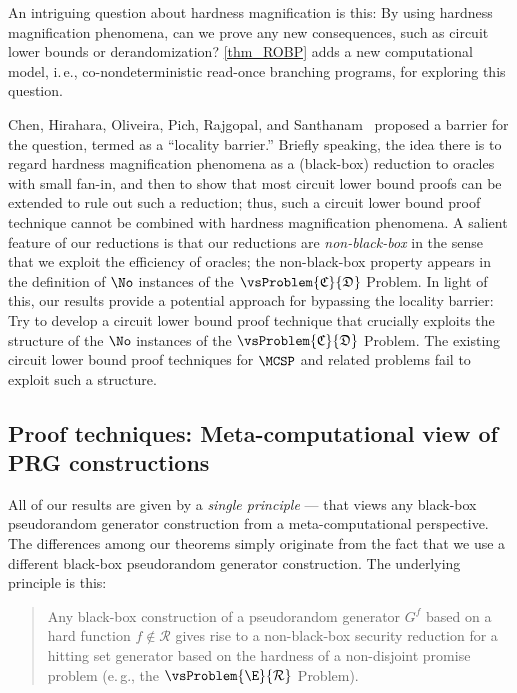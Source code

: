 \documentclass[11pt]{article}
\numberwithin{equation}{section}
\theoremstyle{definition}
\theoremstyle{plain}
\newcommand{\ie}{i.\,e.}
\newcommand{\eg}{e.\,g.}
\begin{document}
An intriguing question about hardness magnification is this:
By using hardness magnification phenomena,
can we prove any new consequences, such as
circuit lower bounds or derandomization?
%
\cref{thm_ROBP} adds a new computational model, \ie, co-nondeterministic read-once branching programs,
for exploring this question.

Chen, Hirahara, Oliveira, Pich, Rajgopal, and Santhanam~\cite{ChenHOPRS20_innovations_conf}
proposed a barrier for the question, termed as a ``locality barrier.''
Briefly speaking, the idea there is to regard hardness magnification phenomena
as a (black-box) reduction to oracles with small fan-in,
and then to show that most circuit lower bound proofs can be extended to rule
out such a reduction;
thus, such a circuit lower bound proof technique cannot be combined
with hardness magnification phenomena.
A salient feature of our reductions is that our reductions are \emph{non-black-box}
in the sense that we exploit the efficiency of oracles;
the non-black-box property appears in the definition of $\No$ instances of the $\vsProblem{\mathfrak{C}}{\mathfrak{D}}$ Problem.
In light of this,
our results provide a potential approach for bypassing the locality barrier:
Try to develop a circuit lower bound proof technique that crucially exploits
the structure of the $\No$ instances of  the $\vsProblem{\mathfrak{C}}{\mathfrak{D}}$ Problem.
The existing circuit lower bound proof techniques for $\MCSP$ and related problems fail to exploit such a structure.

%

%
%



%
%
%
%
%
%
%
%
%
%
%
%
%
%
%
%
%
%
%
%
%
%
%
%
%
%
%
%
%
%
%
%
%
%
%


\subsection{Proof techniques: Meta-computational view of PRG constructions}
\label{subsection:proofsketch}

All of our results are given by a \emph{single principle} --- that views
any black-box pseudorandom generator construction from a meta-computational perspective.
The differences among our theorems simply originate from the fact that we use a different black-box pseudorandom generator construction.
The underlying principle is this:
%
%
%
%
%
%
%
\begin{quote}
  Any black-box construction of
  a pseudorandom generator $G^f$
  based on a hard function $f \not\in \mathcal{R}$
  gives rise to
  a non-black-box security reduction
  for a hitting set generator
  based on the hardness of a non-disjoint promise problem
  (\eg, the $\vsProblem{\E}{\mathcal{R}}$ Problem).
\end{quote}
\end{document}
